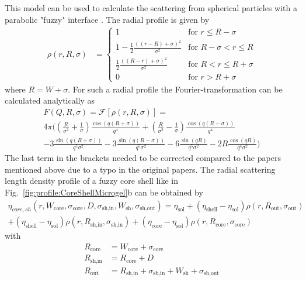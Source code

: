 This model can be used to calculate the scattering from spherical
particles with a parabolic "fuzzy" interface \cite{Berndt2005,Berndt2006,Berndt2006a}.
The radial profile is given by
\begin{align}
\rho(r,R,\sigma) &=
\begin{cases}
1 & \mbox{for } r\leq R-\sigma \\
1-\frac{1}{2}\frac{\left((r-R)+\sigma\right)^2}{\sigma^2} & \mbox{for } R-\sigma < r \leq R \\
\frac{1}{2}\frac{\left((R-r)+\sigma\right)^2}{\sigma^2} & \mbox{for } R< r\leq R+\sigma \\
0 & \mbox{for } r > R+\sigma
\end{cases}
\label{eq:CoreShellMicrogelProfile}
\end{align}
where $R=W+\sigma$. For such a radial profile the Fourier-transformation can be calculated analytically as
\begin{multline}
F(Q,R,\sigma) = \mathcal{F}[\rho(r,R,\sigma)] = \\
4 \pi \Bigg(
        \left(\frac{R}{\sigma^2}+\frac{1}{\sigma}\right) \frac{\cos (q(R+\sigma))}{q^4}
    +   \left(\frac{R}{\sigma^2}-\frac{1}{\sigma}\right) \frac{\cos (q(R-\sigma))}{q^4} \\
    -   3 \frac{\sin(q(R+\sigma))}{q^5 \sigma^2}
    -   3 \frac{\sin(q(R-\sigma))}{q^5 \sigma^2}
    -   6  \frac{\sin(qR)}{q^5 \sigma^2}
    -   2 R \frac{\cos(qR)}{q^4 \sigma^2}
\Bigg)
\end{multline}
The last term in the brackets needed to be corrected compared to the papers mentioned above
due to a typo in the original papers.
The radial scattering length density profile of a fuzzy core
shell like in Fig.\ \ref{fig:profile:CoreShellMicrogel}b can be obtained by
\begin{multline}
\eta_{core,sh}(r,W_\textrm{core},\sigma_\textrm{core},D,\sigma_\textrm{sh,in},W_\textrm{sh},\sigma_\textrm{sh,out}) =
    \eta_\textrm{sol}
+ (\eta_\textrm{shell}-\eta_\textrm{sol}) \rho(r,R_\textrm{out},\sigma_\textrm{out}) \\
+ (\eta_\textrm{shell}-\eta_\textrm{sol}) \rho(r,R_\textrm{sh,in},\sigma_\textrm{sh,in})
+ (\eta_\textrm{core} -\eta_\textrm{sol}) \rho(r,R_\textrm{core},\sigma_\textrm{core})
\end{multline}
with
\begin{subequations}
\begin{align}
    R_\textrm{core} &= W_\textrm{core}+\sigma_\textrm{core} \\
    R_\textrm{sh,in}&= R_\textrm{core}+D \\
    R_\textrm{out}  &= R_\textrm{sh,in}+\sigma_\textrm{sh,in}+W_\textrm{sh}+\sigma_\textrm{sh,out}
\end{align}
\label{eq:radiiCoreShellMicrogel}
\end{subequations}
